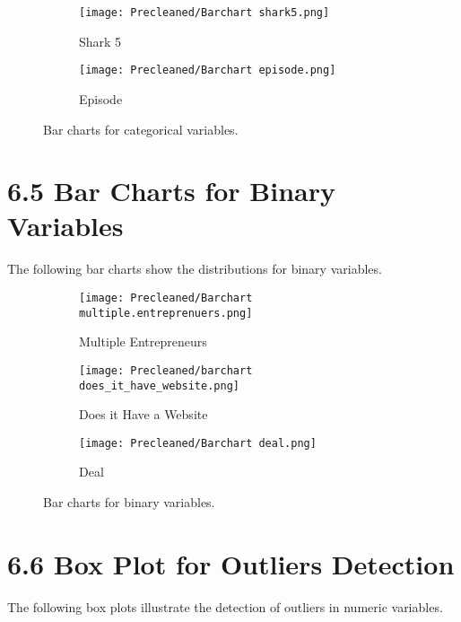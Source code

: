 \documentclass{article}
\begin{document}
\begin{figure}[H]
    \begin{subfigure}[b]{0.45\textwidth}
        \texttt{[image: Precleaned/Barchart shark5.png]} %
        \caption{Shark 5}
        \label{fig:shark 5}
    \end{subfigure}
    \hfill
    \begin{subfigure}[b]{0.45\textwidth}
        \texttt{[image: Precleaned/Barchart episode.png]} %
        \caption{Episode}
        \label{Episode}
    \end{subfigure}    

    \caption{Bar charts for categorical variables.}
    \label{fig:bar_charts_categorical}
\end{figure}

\section*{6.5 Bar Charts for Binary Variables}
The following bar charts show the distributions for binary variables.

\begin{figure}[H]
    \centering
    \begin{subfigure}[b]{0.45\textwidth}
        \texttt{[image: Precleaned/Barchart multiple.entreprenuers.png]} %
        \caption{Multiple Entrepreneurs}
        \label{fig:multiple_entrepreneurs}
    \end{subfigure}
    \hfill
    \begin{subfigure}[b]{0.45\textwidth}
        \texttt{[image: Precleaned/barchart does\_it\_have\_website.png]} %
        \caption{Does it Have a Website}
        \label{fig:does_have_website}
    \end{subfigure}

    \begin{subfigure}[b]{0.7\textwidth}
        \texttt{[image: Precleaned/Barchart deal.png]} %
        \caption{Deal}
        \label{fig:deal}
    \end{subfigure}

    \caption{Bar charts for binary variables.}
    \label{fig:bar_charts_binary}
\end{figure}

\newpage
\section*{6.6 Box Plot for Outliers Detection}
The following box plots illustrate the detection of outliers in numeric variables.
\end{document}

